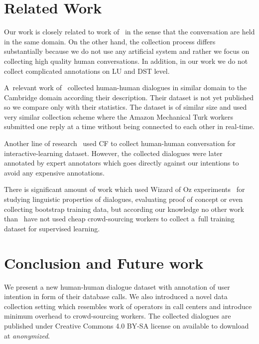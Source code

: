 \documentclass[runningheads,a4paper]{llncs}
\begin{document}
\section{Related Work}
\label{sec:related}

Our work is closely related  to work of~\cite{williams2013dstc1,henderson2014dstc2,henderson2014dstc3} in the sense that the conversation are held in the same domain.
On the other hand, the collection process differs substantially because we do not use any artificial system and rather we focus on collecting high quality human conversations. In addition, in our work we do not collect complicated annotations on LU and DST level.

A~relevant work of~\cite{wen2016network} collected human-human dialogues in similar domain to the Cambridge domain according their description.
Their dataset is not yet published so we compare only with their statistics.
The dataset is of similar size and used very similar collection scheme where the Amazon Mechanical Turk workers submitted one reply at a time without being connected to each other in real-time.

Another line of research~\cite{vodolan2016data} used CF to collect human-human conversation for interactive-learning dataset.
However, the collected dialogues were later annotated by expert annotators which goes directly against our intentions to avoid any expensive annotations.

There is significant amount of work which used Wizard of Oz experiments~\cite{whittaker2002fish,walker1997evaluating,rieser2008learning} for studying linguistic properties of dialogues, evaluating proof of concept or even collecting bootstrap training data, but according our knowledge no other work than~\cite{wen2016network} have not used cheap crowd-sourcing workers to collect a~full training dataset for supervised learning.

\section{Conclusion and Future work}
\label{sec:conc}
We present a new human-human dialogue dataset with annotation of user intention in form of their database calls.
We also introduced a novel data collection setting which resembles work of operators in call centers and introduce minimum overhead to crowd-sourcing workers.
The collected dialogues are published under Creative Commons 4.0 BY-SA license on available to download at {\it anonymized}.  %
\end{document}

